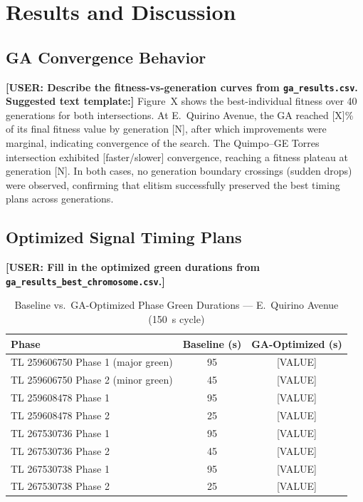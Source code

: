 \documentclass[a4paper,10pt]{article}
\begin{document}
	\section{Results and Discussion}

	\subsection{GA Convergence Behavior}

	\textbf{[USER: Describe the fitness-vs-generation curves from \texttt{ga\_results.csv}.
	Suggested text template:]}
	Figure~X shows the best-individual fitness over 40 generations for both intersections.
	At E.~Quirino Avenue, the GA reached [X]\% of its final fitness value by generation [N],
	after which improvements were marginal, indicating convergence of the search.
	The Quimpo--GE Torres intersection exhibited [faster/slower] convergence, reaching
	a fitness plateau at generation [N]. In both cases, no generation boundary crossings
	(sudden drops) were observed, confirming that elitism successfully preserved the best
	timing plans across generations.

	\subsection{Optimized Signal Timing Plans}

	\textbf{[USER: Fill in the optimized green durations from \texttt{ga\_results\_best\_chromosome.csv}.]}

	\begin{table}[h]
	\centering
	\caption{Baseline vs.\ GA-Optimized Phase Green Durations --- E.~Quirino Avenue (150~s cycle)}
	\begin{tabular}{lcc}
	\hline
	Phase & Baseline (s) & GA-Optimized (s) \\
	\hline
	TL 259606750 Phase 1 (major green) & 95 & {[VALUE]} \\
	TL 259606750 Phase 2 (minor green) & 45 & {[VALUE]} \\
	TL 259608478 Phase 1              & 95 & {[VALUE]} \\
	TL 259608478 Phase 2              & 25 & {[VALUE]} \\
	TL 267530736 Phase 1              & 95 & {[VALUE]} \\
	TL 267530736 Phase 2              & 45 & {[VALUE]} \\
	TL 267530738 Phase 1              & 95 & {[VALUE]} \\
	TL 267530738 Phase 2              & 25 & {[VALUE]} \\
	\hline
	\end{tabular}
	\end{table}
\end{document}
